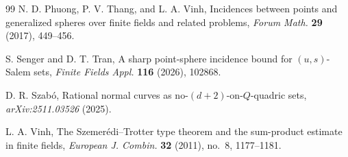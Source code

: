 \documentclass[11pt,letterpaper]{amsart}
\theoremstyle{definition}
\theoremstyle{remark}
\newcommand{\1}{\mathbf 1}
\begin{document}
\begin{thebibliography}{99}
N. D. Phuong, P. V. Thang, and L. A. Vinh,
Incidences between points and generalized spheres over finite fields and related problems,
\emph{Forum Math.} \textbf{29} (2017), 449--456.

S. Senger and D. T. Tran,
A sharp point-sphere incidence bound for $(u,s)$-Salem sets,
\emph{Finite Fields Appl.} \textbf{116} (2026), 102868.

D. R. Szab\'o,
Rational normal curves as no-$(d+2)$-on-$Q$-quadric sets,
\emph{arXiv:2511.03526} (2025).

L. A. Vinh,
The Szemer\'edi--Trotter type theorem and the sum-product estimate in finite fields,
\emph{European J. Combin.} \textbf{32} (2011), no.~8, 1177--1181.

\end{thebibliography}
\end{document}
